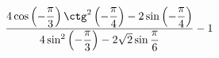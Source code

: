 \begin{ex}[type=calculate]
	\begin{condition}
		\( \dfrac{4\cos\left( -\dfrac{\pi}{3} \right)\ctg^2\left( -\dfrac{\pi}{4} \right)-2\sin\left( -\dfrac{\pi}{4} \right)}{4\sin^2\left( -\dfrac{\pi}{3} \right)-2\sqrt{2}\sin\dfrac{\pi}{6}} -1\)
	\end{condition}
\end{ex}